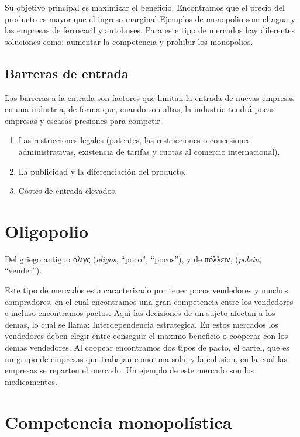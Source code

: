 \documentclass[
]{krantz}
\providecommand{\tightlist}{%
  \setlength{\itemsep}{0pt}\setlength{\parskip}{0pt}}
\begin{document}
Su objetivo principal es maximizar el beneficio. Encontramos que el precio del producto es mayor que el ingreso marginal
Ejemplos de monopolio son: el agua y las empresas de ferrocaril y autobuses.
Para este tipo de mercados hay diferentes soluciones como: aumentar la competencia y prohibir los monopolios.

\hypertarget{barreras-de-entrada}{%
\subsection{Barreras de entrada}\label{barreras-de-entrada}}

Las barreras a la entrada son factores que limitan la entrada de nuevas empresas en una industria, de forma que, cuando son altas, la industria tendrá pocas empresas y escasas presiones para competir.

\begin{enumerate}
\def\labelenumi{\arabic{enumi}.}
\tightlist
\item
  Las restricciones legales (patentes, las restricciones o concesiones administrativas, existencia de tarifas y cuotas al comercio internacional).
\item
  La publicidad y la diferenciación del producto.
\item
  Costes de entrada elevados.
\end{enumerate}

\hypertarget{oligopolio}{%
\section{Oligopolio}\label{oligopolio}}

Del griego antiguo ὀλιγς (\emph{oligos}, ``poco'', ``pocos''), y de πόλλειν, (\emph{polein}, ``vender'').

Este tipo de mercados esta caracterizado por tener pocos vendedores y muchos compradores, en el cual encontramos una gran competencia entre los vendedores e incluso encontramos pactos. Aqui las decisiones de un sujeto afectan a los demas, lo cual se llama: Interdependencia estrategica.
En estos mercados los vendedores deben elegir entre conseguir el maximo beneficio o cooperar con los demas vendedores. Al coopear encontramos dos tipos de pacto, el cartel, que es un grupo de empresas que trabajan como una sola, y la colusion, en la cual las empresas se reparten el mercado.
Un ejemplo de este mercado son los medicamentos.

\hypertarget{competencia-monopoluxedstica}{%
\section{Competencia monopolística}\label{competencia-monopoluxedstica}}
\end{document}
